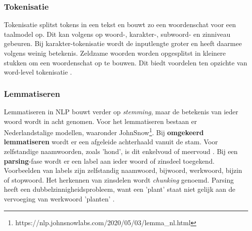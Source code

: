 \subsubsection{Tokenisatie}


Tokenisatie splitst tokens in een tekst en bouwt zo een woordenschat voor een taalmodel op. Dit kan volgens \textcite{Menzli2023} op woord-, karakter-, subwoord- en zinniveau gebeuren. Bij karakter-tokenisatie wordt de inputlengte groter en heeft daarmee volgens \textcite{Ribeiro2018} weinig betekenis. Zeldzame woorden worden opgesplitst in kleinere stukken om een woordenschat op te bouwen. Dit biedt voordelen ten opzichte van word-level tokenisatie \autocite{Iredale2022}.

\subsubsection{Lemmatiseren}

Lemmatiseren in NLP bouwt verder op \textit{stemming}, maar de betekenis van ieder woord wordt in acht genomen. Voor het lemmatiseren bestaan er Nederlandstalige modellen, waaronder JohnSnow\footnote{https://nlp.johnsnowlabs.com/2020/05/03/lemma\_nl.html}. Bij \textbf{omgekeerd lemmatiseren} wordt er een afgeleide achterhaald vanuit de stam. Voor zelfstandige naamwoorden, zoals 'hond', is dit enkelvoud of meervoud \autocite{Eisenstein2019}. Bij een \textbf{parsing}-fase wordt er een label aan ieder woord of zinsdeel toegekend. Voorbeelden van labels zijn zelfstandig naamwoord, bijwoord, werkwoord, bijzin of stopwoord. Het herkennen van zinsdelen wordt \textit{chunking} genoemd. Parsing heeft een dubbelzinnigheidsprobleem, want een 'plant' staat niet gelijk aan de vervoeging van werkwoord 'planten' \autocite{Eisenstein2019}.

